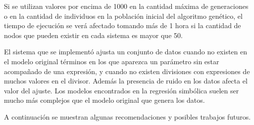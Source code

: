 Si se utilizan valores por encima de 1000 en la cantidad máxima de generaciones o en la cantidad de individuos en la población inicial del algoritmo genético, el tiempo de ejecución se verá afectado tomando más de 1 hora si la cantidad de nodos que pueden existir en cada sistema es mayor que 50.

El sistema que se implementó ajusta un conjunto de datos cuando no existen en el modelo original términos en los que aparezca un parámetro sin estar acompañado de una expresión, y cuando no existen divisiones con expresiones de muchos valores en el divisor. Además la presencia de ruido en los datos afecta el valor del ajuste. Los modelos encontrados en la regresión simbólica suelen ser mucho más complejos que el modelo original que genera los datos.

A continuación se muestran algunas recomendaciones y posibles trabajos futuros.